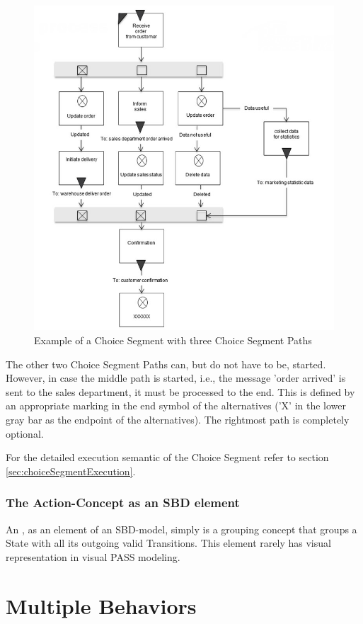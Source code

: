 \begin{figure}[htbp]
	\centering
	\includegraphics[width=0.7\linewidth]{Figures/Ontology/SubjectBehavior/ALternative}
	\caption[Example of a Choice Segment with three Choice Segment Paths]{Example of a Choice Segment with three Choice Segment Paths}
	\label{fig:alternative}
\end{figure}

The other two Choice Segment Paths can, but do not have to be, started. However, in case the middle path is started, i.e., the message 'order arrived' is sent to the sales department, it must be processed to the end. This is defined by an appropriate marking in the end symbol of the alternatives ('X' in the lower gray bar as the endpoint of the alternatives). The rightmost path is completely optional.

For the detailed execution semantic of the Choice Segment refer to section \ref{sec:choiceSegmentExecution}.

\subsubsection{The Action-Concept as an SBD element}

An , as an element of an SBD-model, simply is a grouping concept that groups a State with all its outgoing valid Transitions. This element rarely has visual representation in visual PASS modeling.

\section{Multiple Behaviors}
\label{sec:multipleBehaviors}

